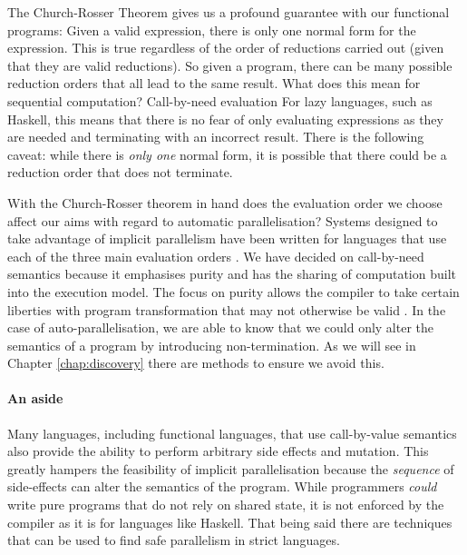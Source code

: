 
The Church-Rosser Theorem gives us a profound guarantee with our
functional programs: Given a valid expression, there is only one normal form
for the expression. This is true regardless of the order of reductions carried
out (given that they are valid reductions). So given a program, there can be
many possible reduction orders that all lead to the same result. What does this
mean for sequential computation? Call-by-need evaluation For lazy languages,
such as Haskell, this means that there is no fear of only evaluating
expressions as they are needed and terminating with an incorrect result. There
is the following caveat: while there is \emph{only one} normal form, it is
possible that there could be a reduction order that does not terminate.

With the Church-Rosser theorem in hand does the evaluation order we choose
affect our aims with regard to automatic parallelisation? Systems designed to
take advantage of implicit parallelism have been written for languages that use
each of the three main evaluation orders . We have decided on call-by-need semantics
because it emphasises purity and has the sharing of computation built into the
execution model. The focus on purity allows the compiler to take certain
liberties with program transformation that may not otherwise be valid
\citep{jones1998transformation}. In the case of auto-parallelisation, we
are able to know that we could only alter the semantics of a program
by introducing non-termination. As we will see in Chapter \ref{chap:discovery}
there are methods to ensure we avoid this.

\paragraph{An aside} Many languages, including functional languages, that use
call-by-value semantics also provide the ability to perform arbitrary side
effects and mutation. This greatly hampers the feasibility of implicit
parallelisation because the \emph{sequence} of side-effects can alter the
semantics of the program. While programmers \emph{could} write pure programs
that do not rely on shared state, it is not enforced by the compiler as it is
for languages like Haskell. That being said there are techniques that can be
used to find safe parallelism in strict languages. 


